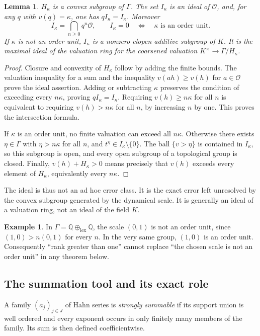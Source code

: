 \documentclass[11pt,a4paper]{article}
\numberwithin{equation}{section}
\theoremstyle{plain}
\newtheorem{lemma}[lemma]{Lemma}
\theoremstyle{definition}
\newtheorem{example}[example]{Example}
\theoremstyle{remark}
\newcommand{\Q}{\mathbb Q}
\newcommand{\OO}{\mathcal O}
\newcommand{\Ik}{I_\kappa}
\begin{document}
\begin{lemma}\label{epd:lem:ideal}
$H_\kappa$ is a convex subgroup of $\Gamma$. The set $\Ik$ is an ideal
of $\OO$, and, for any $q$ with $v(q)=\kappa$, one has $q\Ik=\Ik$.
Moreover
\[
 \Ik=\bigcap_{n\geq0}q^n\OO,
 \qquad
 \Ik=0\quad\Longleftrightarrow\quad \kappa\text{ is an order unit}.
\]
If $\kappa$ is not an order unit, $\Ik$ is a nonzero clopen additive
subgroup of $K$. It is the maximal ideal of the valuation ring for the
coarsened valuation $K^\times\to\Gamma/H_\kappa$.
\end{lemma}
\begin{proof}
Closure and convexity of $H_\kappa$ follow by adding the finite bounds.
The valuation inequality for a sum and the inequality
$v(ah)\geq v(h)$ for $a\in\OO$ prove the ideal assertion. Adding or
subtracting $\kappa$ preserves the condition of exceeding every
$n\kappa$, proving $q\Ik=\Ik$. Requiring $v(h)\geq n\kappa$ for all
$n$ is equivalent to requiring $v(h)>n\kappa$ for all $n$, by increasing
$n$ by one. This proves the intersection formula.

If $\kappa$ is an order unit, no finite valuation can exceed all $n\kappa$.
Otherwise there exists $\eta\in\Gamma$ with $\eta>n\kappa$ for all
$n$, and $t^\eta\in\Ik\setminus\{0\}$. The ball $\{v>\eta\}$ is
contained in $\Ik$, so this subgroup is open, and every open subgroup
of a topological group is closed. Finally,
$v(h)+H_\kappa>0$ means precisely that $v(h)$ exceeds every element of
$H_\kappa$, equivalently every $n\kappa$.
\end{proof}

The ideal is thus not an ad hoc error class. It is the exact error left
unresolved by the convex subgroup generated by the dynamical scale.
It is generally an ideal of a valuation ring, not an ideal of the field
$K$.

\begin{example}\label{epd:ex:ranktwo}
In $\Gamma=\Q\oplus_{\mathrm{lex}}\Q$, the scale $(0,1)$ is not
an order unit, since $(1,0)>n(0,1)$ for every $n$. In the very same group,
$(1,0)$ is an order unit. Consequently ``rank greater than one'' cannot replace
``the chosen scale is not an order unit'' in any theorem below.
\end{example}

\subsection{The summation tool and its exact role}
A family $(a_j)_{j\in J}$ of Hahn series is \emph{strongly summable} if
its support union is well ordered and every exponent occurs in only
finitely many members of the family. Its sum is then defined
coefficientwise.
\end{document}

